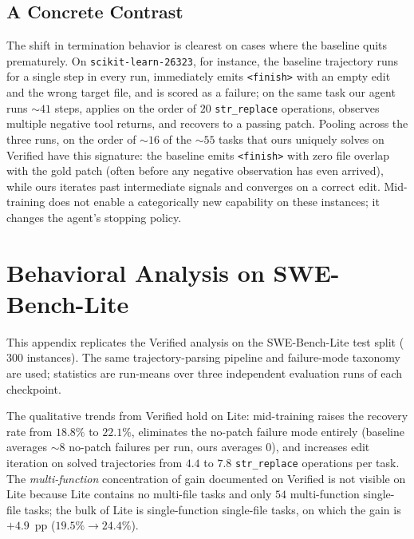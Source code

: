 \subsection{A Concrete Contrast}
\label{app:behavior_extra:contrast}

The shift in termination behavior is clearest on cases where the
baseline quits prematurely. On \texttt{scikit-learn-26323}, for
instance, the baseline trajectory runs for a single step in every run,
immediately emits \texttt{<finish>} with an empty edit and the wrong
target file, and is scored as a failure; on the same task our agent
runs $\sim\!41$ steps, applies on the order of $20$
\texttt{str\_replace} operations, observes multiple negative tool
returns, and recovers to a passing patch. Pooling across the three
runs, on the order of $\sim\!16$ of the $\sim\!55$ tasks that ours
uniquely solves on Verified have this signature: the baseline emits
\texttt{<finish>} with zero file overlap with the gold patch (often
before any negative observation has even arrived), while ours iterates
past intermediate signals and converges on a correct edit.
Mid-training does not enable a categorically new capability on these
instances; it changes the agent's stopping policy.

\section{Behavioral Analysis on SWE-Bench-Lite}
\label{app:behavior_lite}

This appendix replicates the Verified analysis on the SWE-Bench-Lite
test split ($300$ instances). The same trajectory-parsing pipeline and
failure-mode taxonomy are used; statistics are run-means over three
independent evaluation runs of each checkpoint.

The qualitative trends from Verified hold on Lite: mid-training raises
the recovery rate from $18.8\%$ to $22.1\%$, eliminates the no-patch
failure mode entirely (baseline averages $\sim\!8$ no-patch failures
per run, ours averages $0$), and increases edit iteration on solved
trajectories from $4.4$ to $7.8$ \texttt{str\_replace} operations per
task. The \emph{multi-function} concentration of gain documented on
Verified is not visible on Lite because Lite contains no multi-file
tasks and only $54$ multi-function single-file tasks; the bulk of Lite
is single-function single-file tasks, on which the gain is
$+4.9$~pp ($19.5\%\!\to\!24.4\%$).

